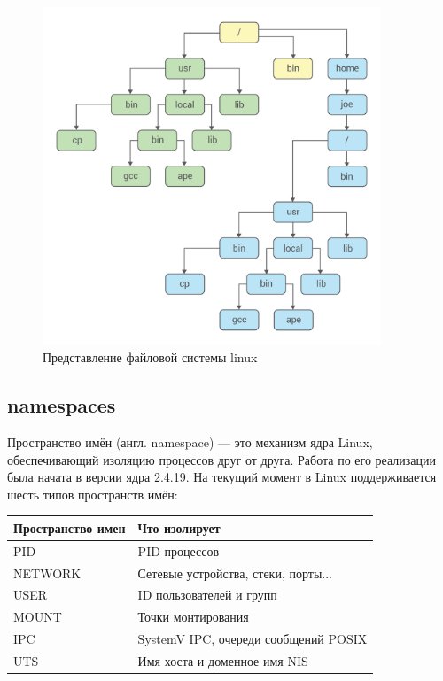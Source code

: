 \begin{figure}[h!]
\centering
\includegraphics[width=0.9\textwidth]{chroot}
\caption{Представление файловой системы linux}
\label{fig3}
\end{figure}

\subsection{namespaces}

Пространство имён (англ. namespace) — это механизм ядра Linux, обеспечивающий изоляцию процессов друг от друга. Работа по его реализации была начата в версии ядра 2.4.19. На текущий момент в Linux поддерживается шесть типов пространств имён:

\begin{table}[]
\begin{tabular}{|l|l|}
\hline
Пространство имен & Что изолирует  \\ \hline
PID & PID процессов  \\ \hline
NETWORK & Сетевые устройства, стеки, порты... \\ \hline
USER & ID пользователей и групп \\ \hline
MOUNT & Точки монтирования \\ \hline
IPC & SystemV IPC, очереди сообщений POSIX \\ \hline
UTS & Имя хоста и доменное имя NIS \\ \hline
\end{tabular}
\end{table}

